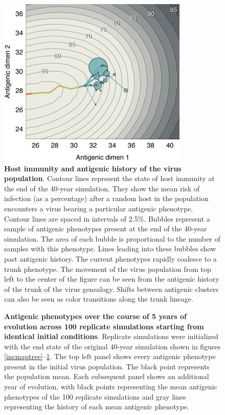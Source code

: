 \documentclass[11pt,oneside,letterpaper]{article}
\begin{document}
\begin{figure}[H]
	\centering
	\includegraphics{figures/immunity}
	\caption{\textbf{Host immunity and antigenic history of the virus population}.  Contour lines represent the state of host immunity at the end of the 40-year simulation.  They show the mean risk of infection (as a percentage) after a random host in the population encounters a virus bearing a particular antigenic phenotype.  Contour lines are spaced in intervals of 2.5\%. Bubbles represent a sample of antigenic phenotypes present at the end of the 40-year simulation.  The area of each bubble is proportional to the number of samples with this phenotype.  Lines leading into these bubbles show past antigenic history.  The current phenotypes rapidly coalesce to a trunk phenotype.  The movement of the virus population from top left to the center of the figure can be seen from the antigenic history of the trunk of the virus genealogy. Shifts between antigenic clusters can also be seen as color transitions along the trunk lineage.}
	\label{immunity}
\end{figure}

\begin{figure}[H]
	\centering
	\caption{\textbf{Antigenic phenotypes over the course of 5 years of evolution across 100 replicate simulations starting from identical initial conditions}.  Replicate simulations were initialized with the end state of the original 40-year simulation shown in figures \ref{incmaptree}--\ref{immunity}.  The top left panel shows every antigenic phenotype present in the initial virus population.  The black point represents the population mean.  Each subsequent panel shows an additional year of evolution, with black points representing the mean antigenic phenotypes of the 100 replicate simulations and gray lines representing the history of each mean antigenic phenotype.}
	\label{replicateevol}
\end{figure}
\end{document}
